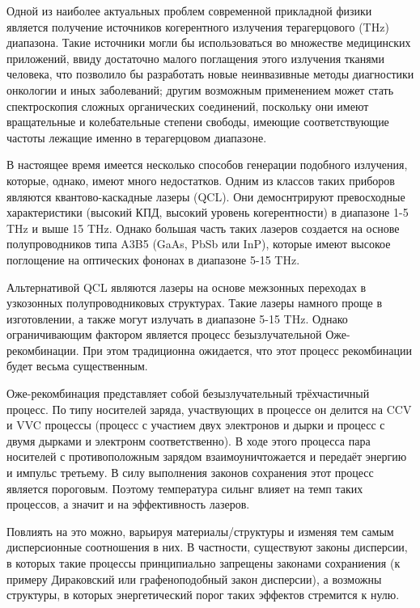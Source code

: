 
Одной из наиболее актуальных проблем современной прикладной физики является
получение источников когерентного излучения терагерцового (THz) диапазона. Такие
источники могли бы использоваться во множестве медицинских приложений, ввиду достаточно 
малого поглащения этого излучения тканями человека, что позволило бы разработать 
новые неинвазивные методы диагностики онкологии и иных заболеваний; другим возможным 
применением может стать спектроскопия сложных органических соединений, поскольку 
они имеют вращательные и колебательные степени свободы, имеющие соответствующие частоты 
лежащие именно в терагерцовом диапазоне.

В настоящее время имеется несколько способов генерации подобного излучения, которые, однако, 
имеют много недостатков. Одним из классов таких приборов являются квантово-каскадные лазеры (QCL).
Они демоснтрируют превосходные характеристики (высокий КПД, высокий уровень когерентности)
в диапазоне 1-5 THz и выше 15 THz. Однако большая часть таких лазеров создается на основе 
полупроводников типа A3B5 (GaAs, PbSb или InP), которые имеют высокое поглощение на оптических 
фононах в диапазоне 5-15 THz.

Альтернативой QCL являются лазеры на основе межзонных переходах в узкозонных полупроводниковых структурах.
Такие лазеры намного проще в изготовлении, а также могут излучать в диапазоне 5-15 THz. Однако ограничивающим
фактором является процесс безызлучательной Оже-рекомбинации. При этом традиционна ожидается, что этот процесс
рекомбинации будет весьма существенным.

Оже-рекомбинация представляет собой безызлучательный трёхчастичный процесс. По типу носителей заряда, участвующих
в процессе он делится на CCV и VVC процессы (процесс с участием двух электронов и дырки и процесс с двумя дырками
и электронм соответственно). В ходе этого процесса пара носителей с противоположным зарядом взаимоуничтожается и
передаёт энергию и импульс третьему. В силу выполнения законов сохранения этот процесс является пороговым.
Поэтому температура сильнг влияет на темп таких процессов, а значит и на эффективность лазеров.

Повлиять на это можно, варьируя материалы/структуры и изменяя тем самым дисперсионные соотношения в них. В частности,
существуют законы дисперсии, в которых такие процессы принципиально запрещены законами сохраниения (к примеру Дираковский 
или графеноподобный закон дисперсии), а возможны структуры, в которых энергетический порог таких эффектов стремится к нулю.


